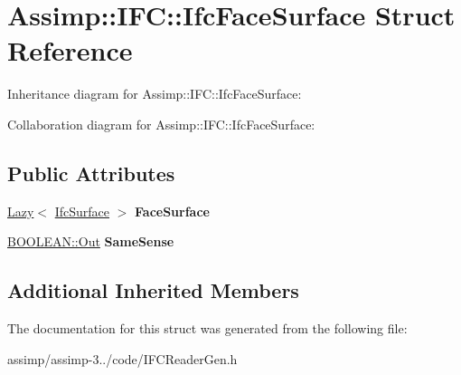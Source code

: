 \hypertarget{struct_assimp_1_1_i_f_c_1_1_ifc_face_surface}{\section{Assimp\+:\+:I\+F\+C\+:\+:Ifc\+Face\+Surface Struct Reference}
\label{struct_assimp_1_1_i_f_c_1_1_ifc_face_surface}
}


Inheritance diagram for Assimp\+:\+:I\+F\+C\+:\+:Ifc\+Face\+Surface\+:


Collaboration diagram for Assimp\+:\+:I\+F\+C\+:\+:Ifc\+Face\+Surface\+:
\subsection*{Public Attributes}
\begin{DoxyCompactItemize}
\item 
\hypertarget{struct_assimp_1_1_i_f_c_1_1_ifc_face_surface_aed518bcfdad12f6540529ba5cfe7f659}{\hyperlink{struct_assimp_1_1_s_t_e_p_1_1_lazy}{Lazy}$<$ \hyperlink{struct_assimp_1_1_i_f_c_1_1_ifc_surface}{Ifc\+Surface} $>$ {\bfseries Face\+Surface}}\label{struct_assimp_1_1_i_f_c_1_1_ifc_face_surface_aed518bcfdad12f6540529ba5cfe7f659}

\item 
\hypertarget{struct_assimp_1_1_i_f_c_1_1_ifc_face_surface_a4212b79d9af16766f127250d2c88c71e}{\hyperlink{classboost_1_1shared__ptr}{B\+O\+O\+L\+E\+A\+N\+::\+Out} {\bfseries Same\+Sense}}\label{struct_assimp_1_1_i_f_c_1_1_ifc_face_surface_a4212b79d9af16766f127250d2c88c71e}

\end{DoxyCompactItemize}
\subsection*{Additional Inherited Members}


The documentation for this struct was generated from the following file\+:\begin{DoxyCompactItemize}
\item 
assimp/assimp-\/3../code/I\+F\+C\+Reader\+Gen.\+h\end{DoxyCompactItemize}
